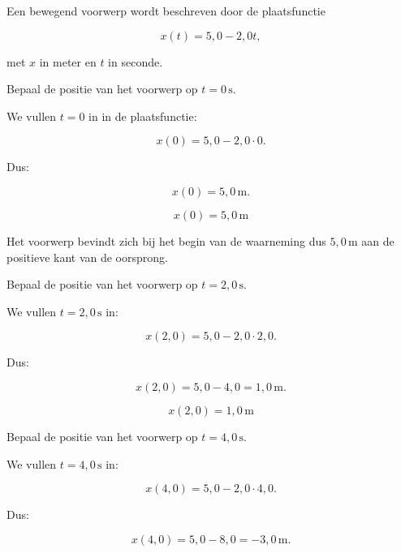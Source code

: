 \documentclass{ximera}
\begin{document}
\begin{oefening}{\oefB\ESS}

  Een bewegend voorwerp wordt beschreven door de plaatsfunctie
  
  \[
  x(t)=5{,}0-2{,}0t,
  \]
  
  met $x$ in meter en $t$ in seconde.
  
  \begin{question}
  Bepaal de positie van het voorwerp op $t=0\,\mathrm{s}$.
  
  \begin{oplossing}
  We vullen $t=0$ in in de plaatsfunctie:
  
  \[
  x(0)
  =
  5{,}0-2{,}0\cdot 0.
  \]
  
  Dus:
  
  \[
  x(0)=5{,}0\,\mathrm{m}.
  \]
  
  \[
  \boxed{x(0)=5{,}0\,\mathrm{m}}
  \]
  
  Het voorwerp bevindt zich bij het begin van de waarneming dus
  $5{,}0\,\mathrm{m}$ aan de positieve kant van de oorsprong.
  \end{oplossing}
  \end{question}
  
  
  \begin{question}
  Bepaal de positie van het voorwerp op $t=2{,}0\,\mathrm{s}$.
  
  \begin{oplossing}
  We vullen $t=2{,}0\,\mathrm{s}$ in:
  
  \[
  x(2{,}0)
  =
  5{,}0-2{,}0\cdot 2{,}0.
  \]
  
  Dus:
  
  \[
  x(2{,}0)
  =
  5{,}0-4{,}0
  =
  1{,}0\,\mathrm{m}.
  \]
  
  \[
  \boxed{x(2{,}0)=1{,}0\,\mathrm{m}}
  \]
  \end{oplossing}
  \end{question}
  
  
  \begin{question}
  Bepaal de positie van het voorwerp op $t=4{,}0\,\mathrm{s}$.
  
  \begin{oplossing}
  We vullen $t=4{,}0\,\mathrm{s}$ in:
  
  \[
  x(4{,}0)
  =
  5{,}0-2{,}0\cdot 4{,}0.
  \]
  
  Dus:
  
  \[
  x(4{,}0)
  =
  5{,}0-8{,}0
  =
  -3{,}0\,\mathrm{m}.
  \]
  

\end{oplossing}
\end{question}
\end{oefening}
\end{document}
